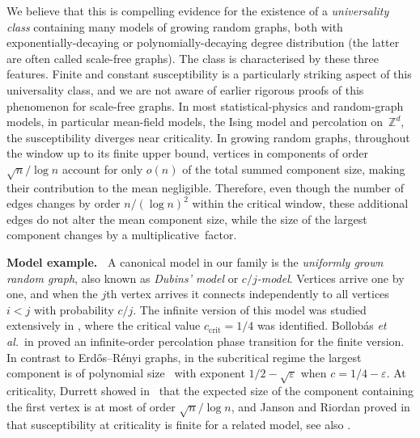 \documentclass[a4paper, a4wide, 10pt, reqno]{amsart}
\theoremstyle{plain}
\theoremstyle{definition}
\numberwithin{equation}{section}
\newcommand{\Z}{{\mathbb Z}}
\begin{document}
We believe that this is compelling evidence for the existence of a \emph{universality class} containing many models of growing random graphs, both with exponentially-decaying or polynomially-decaying degree distribution (the latter are often called scale-free graphs). The class  is characterised by these three features.
Finite and constant susceptibility is a particularly striking aspect of this universality class, and we are not aware of earlier rigorous proofs of this phenomenon for scale-free graphs.  
In most statistical-physics and random-graph models, in particular mean-field models, the Ising model and percolation on~$\Z^d$, the susceptibility diverges near criticality.
In growing random graphs, throughout the window up to its finite upper bound, vertices in components of order $\sqrt{n}/\log n$ account for only $o(n)$ of the total summed component size, making their contribution to the mean negligible. Therefore,
even though the number of edges changes by order $n/(\log n)^2$ within the critical window, these additional edges do not alter the mean component size, while the size of the largest component changes by a multiplicative~factor.%
\medskip 

\noindent\textbf{Model example.\ }
A canonical model in our family is the \emph{uniformly grown random graph}, also known as \emph{Dubins' model} or \emph{$c/j$-model}. Vertices arrive one by one, and when the $j$th vertex arrives it  connects independently to all vertices $i<j$ with probability $c/j$. 
The infinite version of this model was studied extensively in  \cite{durrett1990critical, kalikow1988random, shepp1989connectedness, zhang1991power}, where the critical value $c_\mathrm{crit}=1/4$ was identified. Bollob\'as \emph{et al.}~in \cite{BJR05} proved an infinite-order percolation phase transition for the finite version. 
In contrast to Erd\H{o}s--R\'enyi graphs, in the subcritical regime the largest component is of polynomial size~\cite{BJR05,MS25} with exponent $1/2-\sqrt{\varepsilon}$ when $c=1/4-\varepsilon$. At criticality, Durrett showed in~\cite{D} that the expected size of the component containing the first vertex is at most of order $\sqrt{n}/\log n$, and Janson and Riordan proved in \cite{JansonRiordanSus} that susceptibility at criticality is finite for a related model, see also \cite{Doro01,D,KrapDer04}. 
\end{document}
